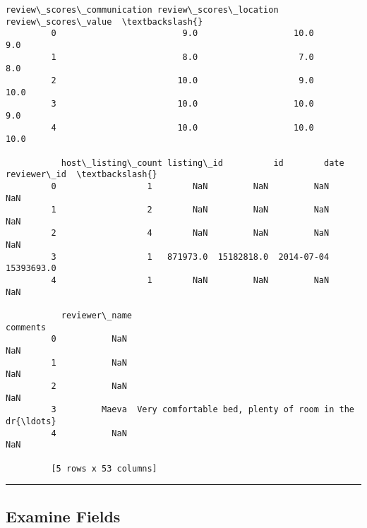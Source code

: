 \documentclass[11pt]{article}
\begin{document}
\begin{Verbatim}[commandchars=\\\{\}]
           review\_scores\_communication review\_scores\_location review\_scores\_value  \textbackslash{}
         0                         9.0                   10.0                 9.0   
         1                         8.0                    7.0                 8.0   
         2                        10.0                    9.0                10.0   
         3                        10.0                   10.0                 9.0   
         4                        10.0                   10.0                10.0   
         
           host\_listing\_count listing\_id          id        date reviewer\_id  \textbackslash{}
         0                  1        NaN         NaN         NaN         NaN   
         1                  2        NaN         NaN         NaN         NaN   
         2                  4        NaN         NaN         NaN         NaN   
         3                  1   871973.0  15182818.0  2014-07-04  15393693.0   
         4                  1        NaN         NaN         NaN         NaN   
         
           reviewer\_name                                           comments  
         0           NaN                                                NaN  
         1           NaN                                                NaN  
         2           NaN                                                NaN  
         3         Maeva  Very comfortable bed, plenty of room in the dr{\ldots}  
         4           NaN                                                NaN  
         
         [5 rows x 53 columns]
\end{Verbatim}
        
    \begin{center}\rule{0.5\linewidth}{\linethickness}\end{center}

    \subsection{Examine Fields}\label{examine-fields}
\end{document}
